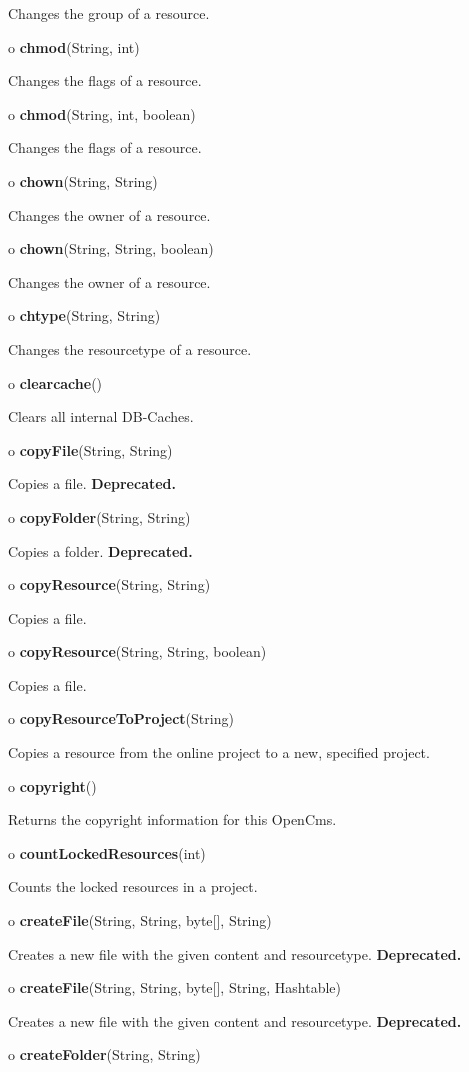 \begin{description}
Changes the group of a resource.
\item o {\bf chmod}(String, int)

Changes the flags of a resource.
\item o {\bf chmod}(String, int, boolean)

Changes the flags of a resource.
\item o {\bf chown}(String, String)

Changes the owner of a resource.
\item o {\bf chown}(String, String, boolean)

Changes the owner of a resource.
\item o {\bf chtype}(String, String)

Changes the resourcetype of a resource.
\item o {\bf clearcache}()

Clears all internal DB-Caches.
\item o {\bf copyFile}(String, String)

Copies a file. {\bf Deprecated.}
\item o {\bf copyFolder}(String, String)

Copies a folder. {\bf Deprecated.}
\item o {\bf copyResource}(String, String)

Copies a file.
\item o {\bf copyResource}(String, String, boolean)

Copies a file.
\item o {\bf copyResourceToProject}(String)

Copies a resource from the online project to a new, specified project.
\item o {\bf copyright}()

Returns the copyright information for this OpenCms.
\item o {\bf countLockedResources}(int)

Counts the locked resources in a project.
\item o {\bf createFile}(String, String, byte[], String)

Creates a new file with the given content and resourcetype.\htmlBR
{\bf Deprecated.}
\item o {\bf createFile}(String, String, byte[], String, Hashtable)

Creates a new file with the given content and resourcetype. {\bf Deprecated.}

\item o {\bf createFolder}(String, String)


\end{description}
